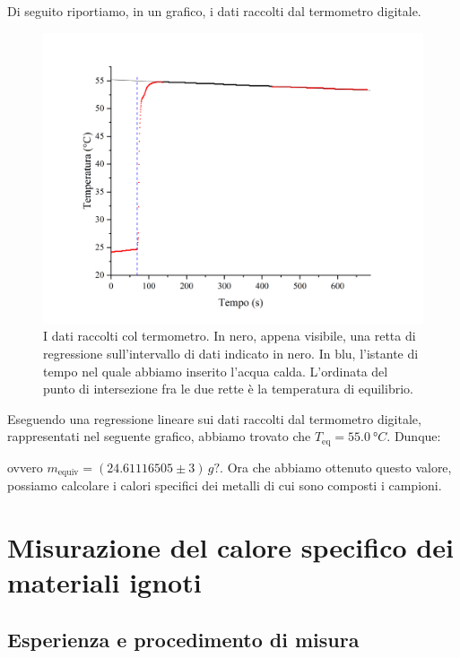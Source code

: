 \documentclass{article}
\begin{document}
Di seguito riportiamo, in un grafico, i dati raccolti dal termometro digitale.

\begin{center}
    \begin{figure}[H]
        \includegraphics[trim={2cm .5cm 2cm 2.1cm},clip,width=\textwidth]{img/RegH2O.jpg}
        \caption{I dati raccolti col termometro.
        In nero, appena visibile, una retta di regressione sull'intervallo di dati indicato in nero.
        In blu, l'istante di tempo nel quale abbiamo inserito l'acqua calda.
        L'ordinata del punto di intersezione fra le due rette è la temperatura di equilibrio.
    }
    \end{figure}
\end{center}

Eseguendo una regressione lineare sui dati raccolti dal termometro digitale, rappresentati nel    %
seguente grafico, abbiamo trovato che $T_\text{eq} = \qty{55.0}{\degree C}$. Dunque:    %

ovvero $m_\text{equiv} = (24.61116505 \pm 3)\,\unit{g}?$. Ora che abbiamo ottenuto questo valore, possiamo calcolare
i calori specifici dei metalli di cui sono composti i campioni.



\section{Misurazione del calore specifico dei materiali ignoti}

\subsection{Esperienza e procedimento di misura}
\end{document}
